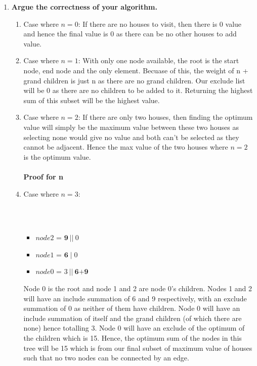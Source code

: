 \documentclass[11pt, oneside]{article}   	%
\begin{document}
\begin{enumerate}
\begin{enumerate}
		\item \textbf{Argue the correctness of your algorithm.}\\
		\begin{enumerate}
			\item Case where $n=0$: If there are no houses to visit, then there is 0 value and hence the final value is 0 as there can be no other houses to add value.
			\item Case where $n=1$: With only one node available, the root is the start node, end node and the only element. Becuase of this, the weight of n + grand children is just n as there are no grand children. Our exclude list will be 0 as there are no children to be added to it. Returning the highest sum of this subset will be the highest value.
			\item Case where $n=2$: If there are only two houses, then finding the optimum value will simply be the maximum value between these two houses as selecting none would give no value and both can't be selected as they cannot be adjacent. Hence the max value of the two houses where $n=2$ is the optimum value.\\
			\\
			\textbf{Proof for n}
			\item Case where $n=3$:\\
			\\
			\\
			\begin{itemize}
				\item $node2$ = $\textbf{9}\:|| \:0$
				\item $node1$ = $\textbf{6}\; |\; 0$
				\item $node0$ = $3\:|| \:\textbf{6+9}$
			\end{itemize}
			Node 0 is the root and node 1 and 2 are node 0's children. Nodes 1 and 2 will have an include summation of 6 and 9 respectively, with an exclude summation of 0 as neither of them have children. Node 0 will have an include summation of itself and the grand children (of which there are none) hence totalling 3. Node 0 will have an exclude of the optimum of the children which is 15. Hence, the optimum sum of the nodes in this tree will be 15 which is from our final subset of maximum value of houses such that no two nodes can be connected by an edge.

\end{enumerate}
\end{enumerate}
\end{enumerate}
\end{document}
